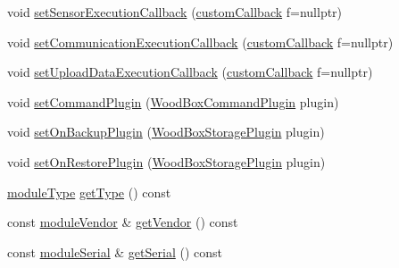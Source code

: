 \begin{DoxyCompactItemize}
\item 
void \mbox{\hyperlink{classwood_box_1_1module_1_1_wood_box_module_ab04481aafdcb9f3ff5ac9c9567f06006}{set\+Sensor\+Execution\+Callback}} (\mbox{\hyperlink{classwood_box_1_1module_1_1_wood_box_module_ab6d400f05cc572fb9fd28dd0baf6d346}{custom\+Callback}} f=nullptr)
\item 
void \mbox{\hyperlink{classwood_box_1_1module_1_1_wood_box_module_af75fdaa122bfa637b3c0273a699adaef}{set\+Communication\+Execution\+Callback}} (\mbox{\hyperlink{classwood_box_1_1module_1_1_wood_box_module_ab6d400f05cc572fb9fd28dd0baf6d346}{custom\+Callback}} f=nullptr)
\item 
void \mbox{\hyperlink{classwood_box_1_1module_1_1_wood_box_module_a1912f897cb51233fdfeb061211dee3d2}{set\+Upload\+Data\+Execution\+Callback}} (\mbox{\hyperlink{classwood_box_1_1module_1_1_wood_box_module_ab6d400f05cc572fb9fd28dd0baf6d346}{custom\+Callback}} f=nullptr)
\item 
void \mbox{\hyperlink{classwood_box_1_1module_1_1_wood_box_module_ad40df0835ac2ffcec83cfb96d12f9079}{set\+Command\+Plugin}} (\mbox{\hyperlink{classwood_box_1_1module_1_1_wood_box_module_ab0e08bb82f5585fd357ce1881855d0e2}{Wood\+Box\+Command\+Plugin}} plugin)
\item 
void \mbox{\hyperlink{classwood_box_1_1module_1_1_wood_box_module_a94cfcf71ecd1d715d14752001fbc7b6a}{set\+On\+Backup\+Plugin}} (\mbox{\hyperlink{classwood_box_1_1module_1_1_wood_box_module_ac7fea0a06e9fcab2ffb63500f6cd6565}{Wood\+Box\+Storage\+Plugin}} plugin)
\item 
void \mbox{\hyperlink{classwood_box_1_1module_1_1_wood_box_module_a85d4efff4708d41e3097479ab364faac}{set\+On\+Restore\+Plugin}} (\mbox{\hyperlink{classwood_box_1_1module_1_1_wood_box_module_ac7fea0a06e9fcab2ffb63500f6cd6565}{Wood\+Box\+Storage\+Plugin}} plugin)
\item 
\mbox{\hyperlink{classwood_box_1_1module_1_1_wood_box_module_af74476c8a785de7fe587c4fb68435673}{module\+Type}} \mbox{\hyperlink{classwood_box_1_1module_1_1_wood_box_module_ab2507312ea013ea5c95b8e1731ddc81d}{get\+Type}} () const
\item 
const \mbox{\hyperlink{classwood_box_1_1module_1_1_wood_box_module_adf5d59bae2980ff138284d0fa885df19}{module\+Vendor}} \& \mbox{\hyperlink{classwood_box_1_1module_1_1_wood_box_module_a2d3f18ce3df3d5fe3b6230fce2199958}{get\+Vendor}} () const
\item 
const \mbox{\hyperlink{classwood_box_1_1module_1_1_wood_box_module_a3a6503bbd5147a06ba50081f97177b46}{module\+Serial}} \& \mbox{\hyperlink{classwood_box_1_1module_1_1_wood_box_module_aa8fc11fbebc7904f144bc40b7654a215}{get\+Serial}} () const

\end{DoxyCompactItemize}
